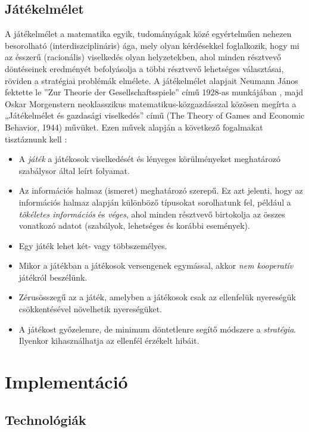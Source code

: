 \documentclass[
]{thesis-ekf}
\theoremstyle{definition}
\theoremstyle{remark}
\begin{document}
\section{Játékelmélet}

A játékelmélet a matematika egyik, tudományágak közé egyértelműen nehezen besorolható (interdiszciplináris) ága, mely olyan kérdésekkel foglalkozik, hogy mi az ésszerű (racionális) viselkedés olyan helyzetekben, ahol minden résztvevő döntéseinek eredményét befolyásolja a többi résztvevő lehetséges választásai, röviden a stratégiai problémák elmélete. A játékelmélet alapjait Neumann János fektette le ''Zur Theorie der Gesellschaftsspiele'' című 1928-as munkájában \cite{Neumann}, majd Oskar Morgenstern neoklasszikus matematikus-közgazdásszal közösen megírta a „Játékelmélet és gazdasági viselkedés” című (The Theory of Games and Economic Behavior, 1944) művüket. \cite{Jatekelmelet,JatekelmeletEn} Ezen művek alapján a következő fogalmakat tisztáznunk kell \cite{NeumannOskar}:

\begin{itemize}
	\item A \emph{játék} a játékosok viselkedését és lényeges körülményeket meghatározó szabálysor által leírt folyamat.
	\item Az információs halmaz (ismeret) meghatározó szerepű. Ez azt jelenti, hogy az információs halmaz alapján különböző típusokat sorolhatunk fel, például a \emph{tökéletes információs} és \emph{véges}, ahol minden résztvevő birtokolja az összes vonatkozó adatot (szabályok, lehetséges és korábbi események).
	\item Egy játék lehet két- vagy többszemélyes.
	\item Mikor a játékban a játékosok versengenek egymással, akkor \emph{nem kooperatív} játékról beszélünk.
	\item Zérusösszegű az a játék, amelyben a játékosok csak az ellenfelük nyereségük csökkentésével növelhetik nyereségüket.
	\item A játékost győzelemre, de minimum döntetlenre segítő módszere a \emph{stratégia}. Ilyenkor kihasználhatja az ellenfél érzékelt hibáit.
\end{itemize} 

\chapter{Implementáció}

\section{Technológiák}
\end{document}
